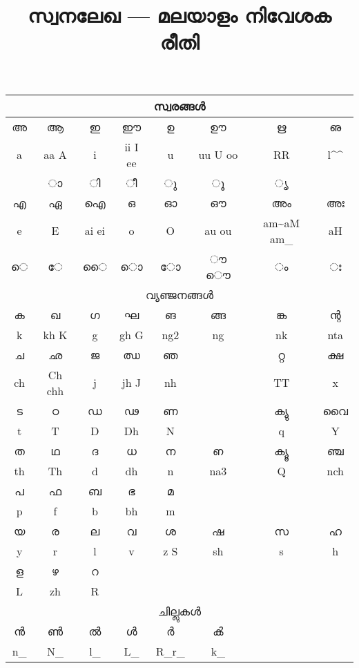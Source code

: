 \documentclass[a4paper]{article}
\makeatletter
\def\en{\color{black!70}\normalsize\En}
\def\mhat{\expandafter\@gobble\string\^}
\def\tldchr{\expandafter\@gobble\string\~}
\def\undchr{\expandafter\@gobble\string\_}
\makeatother
\begin{document}
\Large

\pagestyle{empty}

\title{സ്വനലേഖ --- മലയാളം നിവേശക രീതി}
\date{}
\maketitle
\thispagestyle{empty}
\centering

\begin{tabular}{c|c|c|c|c|c|c|c}
\hline
\multicolumn{8}{c}{സ്വരങ്ങള്‍}\\
\hline
അ & ആ & ഇ & ഈ & ഉ & ഊ & ഋ & ഌ \\
\en a &\en aa A &\en i &\en ii I ee &\en u &\en uu U oo 
        &\en RR & l\mhat\mhat \\
\hline
    & ാ & ി & ീ & ു & ൂ & ൃ & \\
\hline 
എ & ഏ & ഐ & ഒ & ഓ & ഔ & അം & അഃ \\
\en e &\en E &\en ai ei &\en o &\en O &\en au ou &\en am\tldchr\space aM am\undchr &\en aH\\
\hline
െ & േ & ൈ &ൊ & ോ & ൗ ൌ &ം&  ഃ \\
\hline
\multicolumn{8}{c}{വ്യഞ്ജനങ്ങള്‍}\\
\hline
ക & ഖ & ഗ & ഘ & ങ  & ങ്ങ & ങ്ക & ന്റ \\
\en k &\en kh K &\en g &\en gh G& \en ng2 & \en ng &
 \en nk & \en nta \\
\hline 
ച & ഛ & ജ & ഝ & ഞ & & റ്റ & ക്ഷ \\
\en ch & \en Ch chh &\en j &\en jh J &\en nh && \en TT &\en x \\
\hline
ട & ഠ & ഡ & ഢ & ണ && ക്യു & വൈ \\
\en t & \en T &\en D &\en Dh &\en N && \en q &\en Y \\
\hline
ത & ഥ & ദ & ധ & ന & ഩ & ക്യൂ & ഞ്ച \\
\en th &\en Th &\en d &\en dh& \en n & \en na3 & \en Q & \en nch\\
\hline
പ & ഫ & ബ & ഭ & മ && &\\
\en p&\en f &\en b&\en bh & \en m &&&\\
\hline
യ & ര & ല & വ & ശ & ഷ & സ & ഹ \\
\en y&\en r&\en l &\en v&\en z S&\en sh &\en s & \en h\\
\hline
ള & ഴ & റ &&&&&\\
\en L &\en zh &\en R &&&&\\
\hline
\multicolumn{8}{c}{ചില്ലുകള്‍}\\
\hline
ന്‍ & ണ്‍ & ല്‍ & ള്‍ & ര്‍ & ൿ &&\\
\en n\undchr &\en N\undchr &\en l\undchr &\en L\undchr &\en R\undchr \space r\undchr
&\en k\undchr &&\\
\hline

\end{tabular} 
\end{document}
